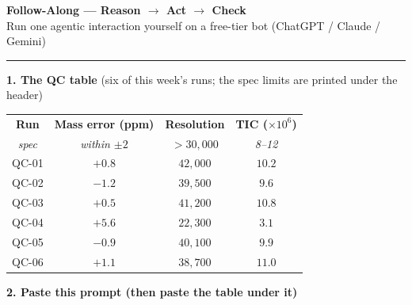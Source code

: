 \documentclass[11pt]{article}
\begin{document}
\begin{center}
{\Large \textbf{Follow-Along --- Reason $\rightarrow$ Act $\rightarrow$ Check}}\\[2pt]
{\normalsize Run one agentic interaction yourself on a free-tier bot (ChatGPT / Claude / Gemini)}
\end{center}

\vspace{-2pt}
\begin{center}
\end{center}

\vspace{2pt}\hrule\vspace{5pt}

{\large \textbf{1. The QC table}}\quad
{\small (six of this week's runs; the spec limits are printed under the header)}

\vspace{4pt}
\begin{center}
\renewcommand{\arraystretch}{1.25}
\begin{tabular}{c c c c}
\toprule
\textbf{Run} & \textbf{Mass error (ppm)} & \textbf{Resolution} & \textbf{TIC ($\times10^6$)} \\
{\small\itshape spec} & {\small\itshape within $\pm 2$} & {\small\itshape $> 30{,}000$} & {\small\itshape 8--12} \\
\midrule
QC-01 & $+0.8$ & $42{,}000$ & $10.2$ \\
QC-02 & $-1.2$ & $39{,}500$ & $9.6$ \\
QC-03 & $+0.5$ & $41{,}200$ & $10.8$ \\
\rowcolor{redsoft}
QC-04 & $+5.6$ & $22{,}300$ & $3.1$ \\
QC-05 & $-0.9$ & $40{,}100$ & $9.9$ \\
QC-06 & $+1.1$ & $38{,}700$ & $11.0$ \\
\bottomrule
\end{tabular}
\end{center}

\vspace{4pt}

{\large \textbf{2. Paste this prompt (then paste the table under it)}}
\end{document}
